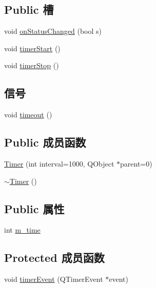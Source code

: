 \subsection*{Public 槽}
\begin{DoxyCompactItemize}
\item 
void \hyperlink{class_timer_a3dcb374fa1f7379ac2fe1130aef2b9b7}{on\+Status\+Changed} (bool s)
\item 
void \hyperlink{class_timer_a69ba0272573a9dc28b5cb48242a88fd1}{timer\+Start} ()
\item 
void \hyperlink{class_timer_adf2076ba5054ae36fc590b3d9affe6f9}{timer\+Stop} ()
\end{DoxyCompactItemize}
\subsection*{信号}
\begin{DoxyCompactItemize}
\item 
void \hyperlink{class_timer_ab8b4318d87a4ce20f552168be58dce1f}{timeout} ()
\end{DoxyCompactItemize}
\subsection*{Public 成员函数}
\begin{DoxyCompactItemize}
\item 
\hyperlink{class_timer_a32e29d892968736ffe67235892804f69}{Timer} (int interval=1000, Q\+Object $\ast$parent=0)
\item 
\hyperlink{class_timer_a14fa469c4c295c5fa6e66a4ad1092146}{$\sim$\+Timer} ()
\end{DoxyCompactItemize}
\subsection*{Public 属性}
\begin{DoxyCompactItemize}
\item 
int \hyperlink{class_timer_a89e77495174acab64a97e5aa49858cf4}{m\+\_\+time}
\end{DoxyCompactItemize}
\subsection*{Protected 成员函数}
\begin{DoxyCompactItemize}
\item 
void \hyperlink{class_timer_a45807ea29e5176d9eea65d3ee49a335a}{timer\+Event} (Q\+Timer\+Event $\ast$event)
\end{DoxyCompactItemize}


